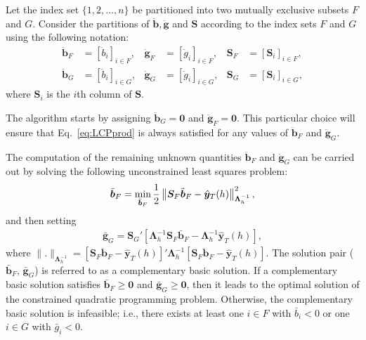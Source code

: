 \documentclass[11pt]{article}
\newcommand{\0}{\phantom{0}}
\begin{document}
Let the index set $\{1, 2, \dots, n\}$ be partitioned into two mutually exclusive subsets $F$ and $G$. Consider the partitions of $\ddot{\bm{b}}, \ddot{\bm{g}}$ and $\bm{S}$ according to the index sets $F$ and $G$ using the following notation:
\begin{align*}
\ddot{\bm{b}}_{F} & = [\ddot{b}_{i}]_{i \in F}, & \ddot{\bm{g}}_{F} & = [\ddot{g}_{i}]_{i \in F}, & \bm{S}_{F} & = [\bm{S}_{i}]_{i \in F},\\
\ddot{\bm{b}}_{G} & = [\ddot{b}_{i}]_{i \in G}, & \ddot{\bm{g}}_{G} & = [\ddot{g}_{i}]_{i \in G}, & \bm{S}_{G} & = [\bm{S}_{i}]_{i \in G},
\end{align*}
where $\bm{S}_{i}$ is the $i$th column of $\bm{S}$.

The algorithm starts by assigning $\ddot{\bm{b}}_{G} = \bm{0}$ and $\ddot{\bm{g}}_{F} = \bm{0}$. This particular choice will ensure that Eq.~\eqref{eq:LCPprod} is always satisfied for any values of $\ddot{\bm{b}}_{F}$ and $\ddot{\bm{g}}_{G}$.

The computation of the remaining unknown quantities $\ddot{\bm{b}}_{F}$ and $\ddot{\bm{g}}_{G}$ can be carried out by solving the following unconstrained least squares problem:
\begin{align}
\label{eq:basicquad}
\bar{\bm{b}}_{F} = \operatornamewithlimits{min}_{\ddot{\bm{b}}_{F}} \frac{1}{2}\left\|\bm{S}_{F}\ddot{\bm{b}}_{F} - \hat{\bm{y}}_{T}(h)\right\|^{2}_{\bm{\Lambda}_{h}^{-1}},
\end{align}
and then setting
\begin{align}
\label{eq:basicgrad}
\bar{\bm{g}}_{G} = \bm{S}_{G}'[\bm{\Lambda}_{h}^{-1}\bm{S}_{F}\bar{\bm{b}}_{F} - \bm{\Lambda}_{h}^{-1}\hat{\bm{y}}_{T}(h)],
\end{align}
where $\|.\|_{\bm{\Lambda}_{h}^{-1}} = [\bm{S}_{F}\ddot{\bm{b}}_{F} - \hat{\bm{y}}_{T}(h)]'\bm{\Lambda}_{h}^{-1} [\bm{S}_{F}\ddot{\bm{b}}_{F} - \hat{\bm{y}}_{T}(h)]$. The solution pair ($\bar{\bm{b}}_{F}$, $\bar{\bm{g}}_{G}$) is referred to as a complementary basic solution. If a complementary basic solution satisfies $\bar{\bm{b}}_{F} \geq \bm{0}$ and $\bar{\bm{g}}_{G} \geq \bm{0}$, then it leads to the optimal solution of the constrained quadratic programming problem. Otherwise, the complementary basic solution is infeasible; i.e., there exists at least one $i \in F$ with $\bar{b}_{i} < 0$ or one $i \in G$ with $\bar{g}_{i} < 0$.
\end{document}
